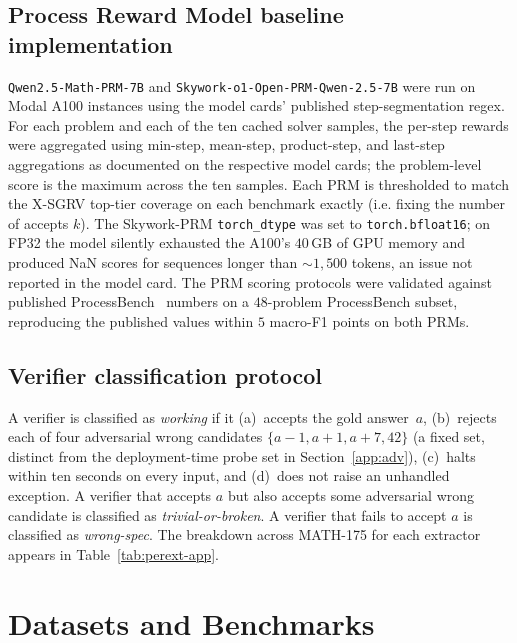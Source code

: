 \documentclass{article}
\begin{document}
\subsection{Process Reward Model baseline implementation}
\label{app:prm}

\texttt{Qwen2.5-Math-PRM-7B} and
\texttt{Skywork-o1-Open-PRM-Qwen-2.5-7B} were run on Modal A100 instances
using the model cards' published step-segmentation regex. For each
problem and each of the ten cached solver samples, the per-step rewards
were aggregated using min-step, mean-step, product-step, and last-step
aggregations as documented on the respective model cards; the
problem-level score is the maximum across the ten samples. Each PRM is
thresholded to match the X-SGRV top-tier coverage on each benchmark
exactly (i.e. fixing the number of accepts $k$). The Skywork-PRM
\texttt{torch\_dtype} was set to \texttt{torch.bfloat16}; on FP32 the
model silently exhausted the A100's $40$\,GB of GPU memory and produced
NaN scores for sequences longer than $\sim$$1{,}500$ tokens, an issue
not reported in the model card. The PRM scoring protocols were validated
against published ProcessBench~\citep{processbench2024} numbers on a
$48$-problem ProcessBench subset, reproducing the published values
within $5$ macro-F1 points on both PRMs.

\subsection{Verifier classification protocol}
\label{app:classify}

A verifier is classified as \emph{working} if it (a)~accepts the gold
answer~$a$, (b)~rejects each of four adversarial wrong candidates
$\{a-1, a+1, a+7, 42\}$ (a fixed set, distinct from the deployment-time
probe set in Section~\ref{app:adv}), (c)~halts within ten seconds on every
input, and (d)~does not raise an unhandled exception. A verifier that
accepts $a$ but also accepts some adversarial wrong candidate is
classified as \emph{trivial-or-broken}. A verifier that fails to accept
$a$ is classified as \emph{wrong-spec}. The breakdown across MATH-175
for each extractor appears in Table~\ref{tab:perext-app}.

\section{Datasets and Benchmarks}
\label{app:data}
\end{document}
